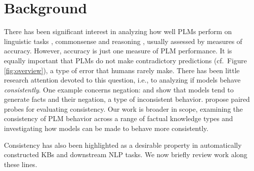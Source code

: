 







\section{Background}
\label{sec:background}
There has been significant interest in analyzing how well
PLMs \cite{rogers2020primer} perform on
linguistic tasks
\cite{yoav-syntax,hewitt2019structural,tenney2019bert,amnesic_probing},
commonsense \cite{forbes2019neural,
  da2019cracking,zhang2020language} and reasoning
\cite{talmor2019olmpics,
  kassner-etal-2020-pretrained}, usually assessed by
measures of accuracy.
However, accuracy is just one measure of PLM performance. It is
equally important that PLMs do not make contradictory
predictions (cf.\ Figure \ref{fig:overview}), a type of
error that humans rarely make.
There has been
little research attention devoted to this
question, i.e., to analyzing if
models behave \emph{consistently}.
One example concerns negation:
\citet{Ettinger_2020} and \citet{kassner-schutze-2020-negated}
show
that models tend to generate facts and their negation, a
type of inconsistent behavior.
propose paired probes for evaluating consistency.
 Our work is
broader in scope, examining the consistency of PLM behavior across a
range of factual knowledge types and investigating how
models can be made to behave more consistently.



Consistency has also been highlighted as a desirable
property in automatically constructed KBs and downstream NLP
tasks. We now briefly review work along these lines.

